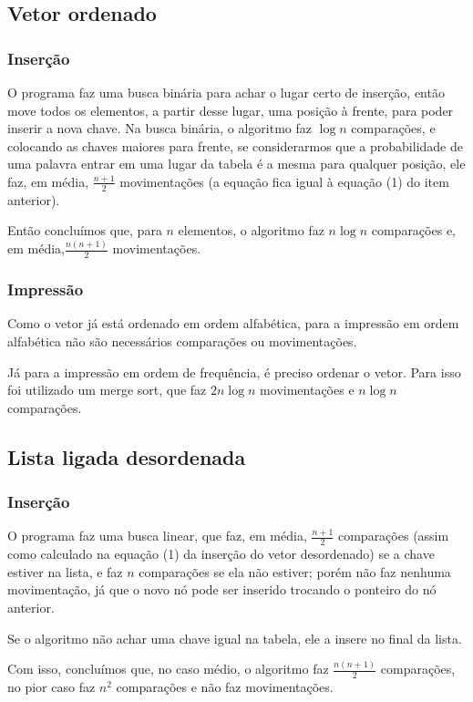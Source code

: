 \documentclass[12pt, a4paper]{article} %
\begin{document}
	\subsection{Vetor ordenado}
		\subsubsection{Inserção}
		\par O programa faz uma busca binária para achar o lugar certo de inserção, então move todos os elementos, a partir desse lugar, uma posição à frente, para poder inserir a nova chave. Na busca binária, o algoritmo faz $\log n$ comparações, e colocando as chaves maiores para frente, se considerarmos que a probabilidade de uma palavra entrar em uma lugar da tabela é a mesma para qualquer posição, ele faz, em média, $\frac{n+1}{2}$ movimentações (a equação fica igual à equação (1) do item anterior).
		\par Então concluímos que, para $n$ elementos, o algoritmo faz $n\log n$ comparações e, em média,$ \frac{n(n+1)}{2}$ movimentações.
		\subsubsection{Impressão}
		\par Como o vetor já está ordenado em ordem alfabética, para a impressão em ordem alfabética não são necessários comparações ou movimentações.
		\par Já para a impressão em ordem de frequência, é preciso ordenar o vetor. Para isso foi utilizado um merge sort, que faz $2n\log n$ movimentações e $n\log n$ comparações.

	\subsection{Lista ligada desordenada}
		\subsubsection{Inserção}
		\par O programa faz uma busca linear, que faz, em média, $\frac{n+1}{2}$ comparações (assim como calculado na equação (1) da inserção do vetor desordenado) se a chave estiver na lista, e faz $n$ comparações se ela não estiver; porém não faz nenhuma movimentação, já que o novo nó pode ser inserido trocando o ponteiro do nó anterior.
		\par Se o algoritmo não achar uma chave igual na tabela, ele a insere no final da lista.
		\par Com isso, concluímos que, no caso médio, o algoritmo faz $\frac{n(n+1)}{2}$ comparações, no pior caso faz $n^2$ comparações e não faz movimentações.
\end{document}

